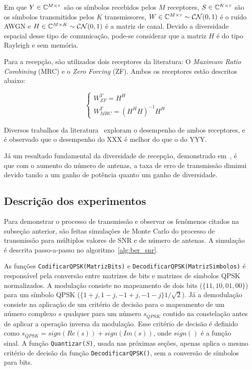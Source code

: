 \documentclass{article}
\begin{document}
Em que $Y\in\mathbb{C}^{M\times\tau}$ são os símbolos recebidos pelos $M$ receptores, $S\in\mathbb{C}^{K\times\tau}$ são os símbolos transmitidos pelos $K$ transmissores, $W\in\mathbb{C}^{M\times\tau}\sim\mathcal{C}\mathcal{N}(0,1)$ é o ruído AWGN e $H\in\mathbb{C}^{M\times K}\sim\mathcal{C}\mathcal{N}(0,1)$ é a matriz de canal. Devido a diversidade espacial desse tipo de comunicação, pode-se considerar que a matriz $H$ é do tipo Rayleigh e sem memória. 

Para a recepção, são utilizados dois receptores da literatura: O \textit{Maximum Ratio Combining} (MRC) e o \textit{Zero Forcing} (ZF). Ambos os receptores estão descritos abaixo: 

\begin{equation}
\begin{cases}
    W^T_{ZF} = H^H \\
    W^T_{MRC} = (H^HH)^{-1}H^H
\end{cases}
\end{equation}

Diversos trabalhos da literatura~\cite{} exploram o desempenho de ambos receptores, e é observado que o desempenho do XXX é melhor do que o do YYY. 

Já um resultado fundamental da diversidade de recepção, demonstrado em~\cite[eq. 3.70 e 3.71]{tse.viswanath_2005}, é que com o aumento do número de antenas, a taxa de erro de transmissão diminui devido tando a um ganho de potência quanto um ganho de diversidade. 

\subsection{Descrição dos experimentos}

Para demonstrar o processo de transmissão e observar os fenômenos citados na subseção anterior, são feitas simulações de Monte Carlo do processo de transmissão para múltiplos valores de SNR e de número de antenas. A simulação é descrita passo-a-passo no algoritmo~\ref{alg:ber_snr}. 

As funções \texttt{CodificarQPSK(MatrizBits)} e \texttt{DecodificarQPSK(MatrizSimbolos)} é responsável pela conversão entre matrizes de bits e matrizes de símbolos QPSK normalizados. A modulação consiste no mapeamento de dois bits ($\{11,10,01,00\}$) para um símbolo QPSK ($\{1+j,1-j,-1+j,-1-j\}1/\sqrt{2}$). Já a demodulação consiste na aplicação de um critério de decisão para o mapeamento de um número complexo $s$ qualquer para um número $s_{QPSK}$ contido na constelação antes de aplicar a operação inversa da modulação. Esse critério de decisão é definido como $s_{QPSK}=sign(Re(s))+sign(Im(s))$, onde $sign()$ é a função sinal. A função \texttt{Quantizar($S$)}, usada nas próximas seções, apenas aplica o mesmo critério de decisão da função \texttt{DecodificarQPSK()}, sem a conversão de símbolos para bits. 
\end{document}
